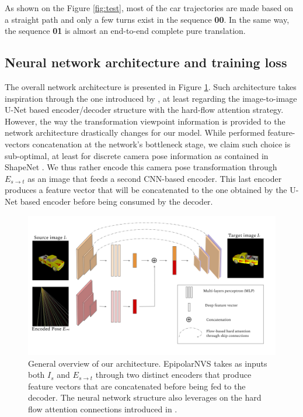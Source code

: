   


As shown on the Figure \ref{fig:test}, most of the car trajectories are made based on a straight path and only a few turns exist in the sequence \textbf{00}. In the same way, the sequence \textbf{01} is almost an end-to-end complete pure translation.


\subsection{Neural network architecture and training loss}

The overall network architecture is presented in Figure \ref{fig:architecture}. Such architecture takes inspiration through the one introduced by \citep{kim2020novel}, at least regarding the image-to-image U-Net based encoder/decoder structure with the hard-flow attention strategy. However, the way the transformation viewpoint information is provided to the network architecture drastically changes for our model. While \citep{kim2020novel} performed feature-vectors concatenation at the network's bottleneck stage, we claim such choice is sub-optimal, at least for discrete camera pose information as contained in ShapeNet \citep{chang2015shapenet}. We thus rather encode this camera pose transformation through $E_{s\xrightarrow{}t}$ as an image that feeds a second CNN-based encoder. This last encoder produces a feature vector that will be concatenated to the one obtained by the U-Net based encoder before being consumed by the decoder. 

\begin{figure}[h!]
  \begin{center}
  \includegraphics[width=\textwidth]{images/epipolarnvs/NetworkArchitecture.png}
  \end{center}
  \caption{General overview of our architecture. EpipolarNVS takes as inputs both $I_s$ and $E_{s\xrightarrow{}t}$ through two distinct encoders that produce feature vectors that are concatenated before being fed to the decoder. The neural network structure also leverages on the hard flow attention connections introduced in \citep{kim2020novel}.}
  \label{fig:architecture}
\end{figure}

